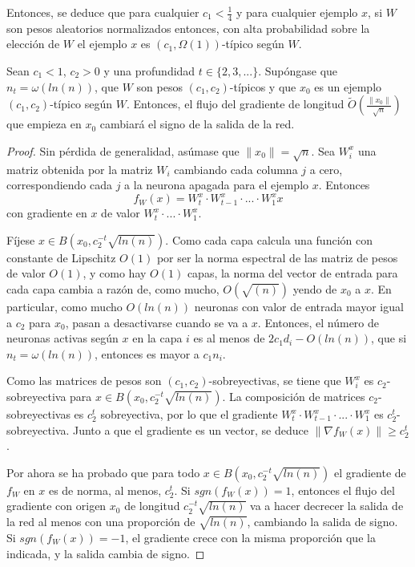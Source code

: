 Entonces, se deduce que para cualquier $c_1 < \frac{1}{4}$ y para cualquier ejemplo $x$, si $W$ son pesos aleatorios normalizados entonces, con alta probabilidad sobre la elección de $W$ el ejemplo $x$ es $(c_1,\Omega(1))$-típico según $W$.

\begin{teorema} \label{teom220}
Sean $c_1 < 1$, $c_2 > 0$ y una profundidad $t \in \{2,3,...\}$. Supóngase que $n_t=\omega(ln(n))$, que $W$ son pesos $(c_1,c_2)$-típicos y que $x_0$ es un ejemplo $(c_1,c_2)$-típico según $W$. Entonces, el flujo del gradiente de longitud $\tilde{O} \left( \frac{\|x_0 \|}{\sqrt{n}} \right)$ que empieza en $x_0$ cambiará el signo de la salida de la red.
\end{teorema}

\begin{proof}
Sin pérdida de generalidad, asúmase que $\|x_0 \| = \sqrt{n}$. Sea $W_i^x$ una matriz obtenida por la matriz $W_i$ cambiando cada columna $j$ a cero, correspondiendo cada $j$ a la neurona apagada para el ejemplo $x$. Entonces
$$f_{W}(x) = W_t^x \cdot W_{t-1}^x \cdot ... \cdot W_1^x x$$
con gradiente en $x$ de valor $W_t^x \cdot ... \cdot W_1^x$.

Fíjese $x \in B(x_0,c_2^{-t} \sqrt{ln(n)})$. Como cada capa calcula una función con constante de Lipschitz $O(1)$ por ser la norma espectral de las matriz de pesos de valor $O(1)$, y como hay $O(1)$ capas, la norma del vector de entrada para cada capa cambia a razón de, como mucho, $O(\sqrt{(n)})$ yendo de $x_0$ a $x$. En particular, como mucho $O(ln(n))$ neuronas con valor de entrada mayor igual a $c_2$ para $x_0$, pasan a desactivarse cuando se va a $x$. Entonces, el número de neuronas activas según $x$ en la capa $i$ es al menos de $2 c_1 d_i - O(ln(n))$, que si $n_t = \omega(ln(n))$, entonces es mayor a $c_1 n_i$.

Como las matrices de pesos son $(c_1,c_2)$-sobreyectivas, se tiene que $W_i^x$ es $c_2$-sobreyectiva para $x \in B(x_0,c_2^{-t} \sqrt{ln(n)})$. La composición de matrices $c_2$-sobreyectivas es $c_2^{t}$ sobreyectiva, por lo que el gradiente $W_t^x \cdot W_{t-1}^x \cdot ... \cdot W_1^x$ es $c_2^{t}$-sobreyectiva. Junto a que el gradiente es un vector, se deduce $\|\nabla f_{W}(x) \| \geq c_2^t$.

Por ahora se ha probado que para todo $x \in B(x_0,c_2^{-t} \sqrt{ln(n)})$ el gradiente de $f_{W}$ en $x$ es de norma, al menos, $c_2^{t}$. Si $sgn(f_{W}(x))=1$, entonces el flujo del gradiente con origen $x_0$ de longitud $c_2^{-t} \sqrt{ln(n)}$ va a hacer decrecer la salida de la red al menos con una proporción de $\sqrt{ln(n)}$, cambiando la salida de signo. Si $sgn(f_{W}(x))=-1$, el gradiente crece con la misma proporción que la indicada, y la salida cambia de signo.
\end{proof}


